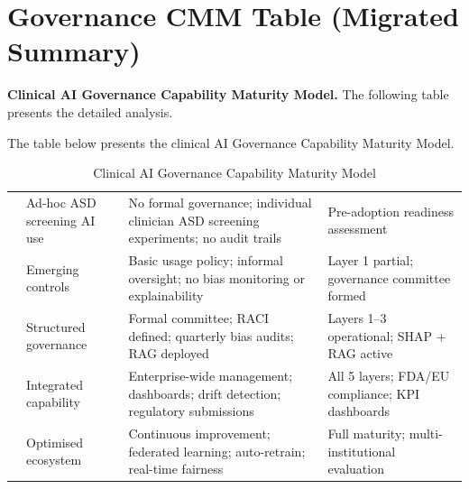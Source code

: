 \section*{Governance CMM Table (Migrated Summary)}
\label{sec:app_ch5_tab_governance_maturity_app}


\noindent\textbf{Clinical AI Governance Capability Maturity Model.} The following table presents the detailed analysis.

\noindent The table below presents the clinical AI Governance Capability Maturity Model.

\begin{table}[H]
\tablestripes
\tablefontsize
\caption{Clinical AI Governance Capability Maturity Model}
\begin{tabularx}{\textwidth}{@{} >{\raggedright\arraybackslash}p{0.7cm} L L L @{}}
\toprule
{} &  &  &  \\
 & Ad-hoc ASD screening AI use & No formal governance; individual clinician ASD screening experiments; no audit trails & Pre-adoption readiness assessment \\
 & Emerging controls & Basic usage policy; informal oversight; no bias monitoring or explainability & Layer 1 partial; governance committee formed \\
 & Structured governance & Formal committee; RACI defined; quarterly bias audits; RAG deployed & Layers 1--3 operational; SHAP + RAG active \\
 & Integrated capability & Enterprise-wide management; dashboards; drift detection; regulatory submissions & All 5 layers; FDA/EU compliance; KPI dashboards \\
 & Optimised ecosystem & Continuous improvement; federated learning; auto-retrain; real-time fairness & Full maturity; multi-institutional evaluation \\
\bottomrule
\end{tabularx}
\end{table}


